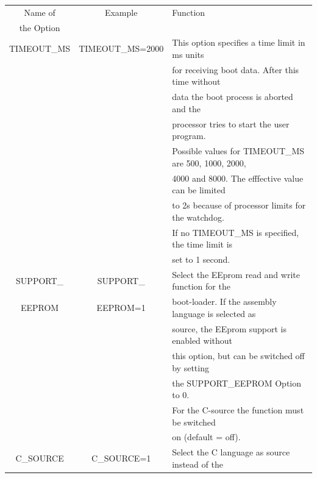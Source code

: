 \begin{table}[H]
  \begin{center}
    \begin{tabular}{| c | c | l |}
    \hline
   Name of        & Example        & Function                                            \\
   the Option     &                &                                                     \\
    \hline
    \hline
 TIMEOUT\_MS       & TIMEOUT\_MS=2000 & This option specifies a time limit in ms units \\
                   &                  & for receiving boot data. After this time without \\
                   &                  & data the boot process is aborted and the \\
                   &                  & processor tries to start the user program. \\
                   &                  & Possible values for TIMEOUT\_MS are 500, 1000, 2000, \\
                   &                  & 4000 and 8000. The efffective value can be limited \\
                   &                  & to 2s because of processor limits for the watchdog. \\
                   &                  & If no TIMEOUT\_MS is specified, the time limit is \\
                   &                  & set to 1 second. \\
    \hline
    SUPPORT\_      & SUPPORT\_      & Select the EEprom read and write function for the  \\
    EEPROM         &  EEPROM=1      & boot-loader. If the assembly language is selected as \\
                   &                & source, the EEprom support is enabled without  \\
                   &                & this option, but can be switched off by setting \\
                   &                & the SUPPORT\_EEPROM Option to 0. \\
                   &                & For the C-source the function must be switched \\
                   &                & on (default = off). \\
    \hline
 C\_SOURCE         & C\_SOURCE=1    & Select the C language as source instead of the  \\

\end{tabular}
\end{center}
\end{table}
